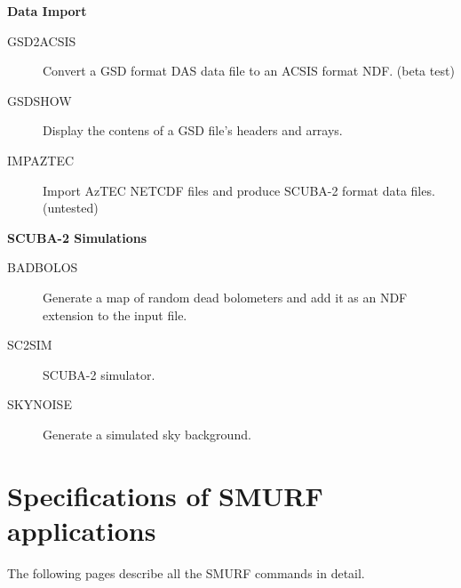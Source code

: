 \documentclass[twoside,11pt]{article}
\newcommand{\htmlref}[2]{#1}
\newcommand{\xlabel}[1]{}
\renewcommand{\_}{\texttt{\symbol{95}}}
\newcommand{\classitem}[1]{\item [\htmlref{#1}{#1}]}
\begin{document}
\begin{small}
{\large
\begin{center}
{\bf Data Import}
\end{center}
}

\begin{description}
\classitem{GSD2ACSIS}
 Convert a GSD format DAS data file to an ACSIS format NDF. (beta test)
\classitem{GSDSHOW}
 Display the contens of a GSD file's headers and arrays.
\classitem{IMPAZTEC}
  Import AzTEC NETCDF files and produce SCUBA-2 format data files. (untested)
\end{description}

{\large
\begin{center}
{\bf SCUBA-2 Simulations}
\end{center}
}

\begin{description}
\classitem{BADBOLOS}
 Generate a map of random dead bolometers and add it as an NDF extension to the input file.
\classitem{SC2SIM}
SCUBA-2 simulator.
\classitem{SKYNOISE}
 Generate a simulated sky background.
\end{description}

\end{small}

\section{\xlabel{ap_full}Specifications of SMURF applications\label{ap:full}}

The following pages describe all the SMURF commands in detail.


\end{document}
